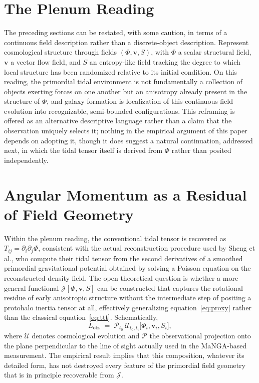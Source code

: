 \documentclass[11pt]{article}
\begin{document}
\section{The Plenum Reading}

The preceding sections can be restated, with some caution, in terms of a continuous field description rather than a discrete-object description. Represent cosmological structure through fields $(\Phi, \mathbf v, S)$, with $\Phi$ a scalar structural field, $\mathbf v$ a vector flow field, and $S$ an entropy-like field tracking the degree to which local structure has been randomized relative to its initial condition. On this reading, the primordial tidal environment is not fundamentally a collection of objects exerting forces on one another but an anisotropy already present in the structure of $\Phi$, and galaxy formation is localization of this continuous field evolution into recognizable, semi-bounded configurations. This reframing is offered as an alternative descriptive language rather than a claim that the observation uniquely selects it; nothing in the empirical argument of this paper depends on adopting it, though it does suggest a natural continuation, addressed next, in which the tidal tensor itself is derived from $\Phi$ rather than posited independently.

\section{Angular Momentum as a Residual of Field Geometry}

Within the plenum reading, the conventional tidal tensor is recovered as $T_{ij} = \partial_i \partial_j \Phi$, consistent with the actual reconstruction procedure used by Sheng et al., who compute their tidal tensor from the second derivatives of a smoothed primordial gravitational potential obtained by solving a Poisson equation on the reconstructed density field. The open theoretical question is whether a more general functional $\mathcal J[\Phi, \mathbf v, S]$ can be constructed that captures the rotational residue of early anisotropic structure without the intermediate step of positing a protohalo inertia tensor at all, effectively generalizing equation~\eqref{eq:proxy} rather than the classical equation~\eqref{eq:ttt}. Schematically,
\begin{equation}
L_{\mathrm{obs}} \;=\; \mathcal P_{t_0}\, \mathcal U_{t_0, t_i}\big[\Phi_i, \mathbf v_i, S_i\big],
\end{equation}
where $\mathcal U$ denotes cosmological evolution and $\mathcal P$ the observational projection onto the plane perpendicular to the line of sight actually used in the MaNGA-based measurement. The empirical result implies that this composition, whatever its detailed form, has not destroyed every feature of the primordial field geometry that is in principle recoverable from $\mathcal J$.
\end{document}
